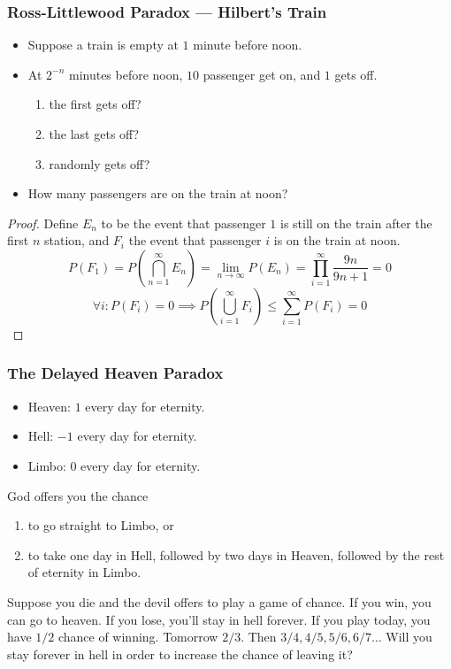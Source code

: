 \documentclass[UTF8,11pt,colorlinks,compress,openany]{beamer}%
\begin{document}
\begin{frame}\frametitle{Ross-Littlewood Paradox --- Hilbert's Train}
	\begin{block}{}
		\begin{itemize}
			\item Suppose a train is empty at $1$ minute before noon.
			\item At $2^{-n}$ minutes before noon, $10$ passenger get on, and $1$ gets off. 
			\begin{enumerate}
				\item the first gets off?
				\item the last gets off?
				\item randomly gets off?
			\end{enumerate}
			\item How many passengers are on the train at noon?
		\end{itemize}
	\end{block}\vspace{-1ex}
	\begin{proof}
		Define $E_n$ to be the event that passenger $1$ is still on the train after the first $n$ station, and $F_i$ the event that passenger $i$ is on the train at noon.
	\setlength\abovedisplayskip{0pt}
	\setlength\belowdisplayskip{0pt}
		\[P(F_1)=P\left(\bigcap\limits_{n=1}^\infty E_n\right)=\lim\limits_{n\to\infty}P(E_n)=\prod\limits_{i=1}^\infty\dfrac{9n}{9n+1}=0\]
		\[\forall i: P(F_i)=0\implies P\left(\bigcup\limits_{i=1}^\infty F_i\right)\leq\sum\limits_{i=1}^\infty P(F_i)=0\]\vspace{-1ex}
	\end{proof}
\end{frame}

\begin{frame}\frametitle{The Delayed Heaven Paradox}
	\begin{problem}
		\begin{itemize}
			\item Heaven: $1$ every day for eternity.
			\item Hell: $-1$ every day for eternity.
			\item Limbo: $0$ every day for eternity.
		\end{itemize}
		God offers you the chance
		\begin{enumerate}
			\item to go straight to Limbo, or
			\item to take one day in Hell, followed by two days in Heaven, followed by the rest of eternity in Limbo.
		\end{enumerate}
	\end{problem}
	\begin{block}{}
		Suppose you die and the devil offers to play a game of chance. If you win, you can go to heaven. If you lose, you'll stay in hell forever. If you play today, you have $1/2$ chance of winning. Tomorrow $2/3$. Then $3/4, 4/5, 5/6, 6/7\dots$ Will you stay forever in hell in order to increase the chance of leaving it? 
	\end{block}
\end{frame}
\end{document}
